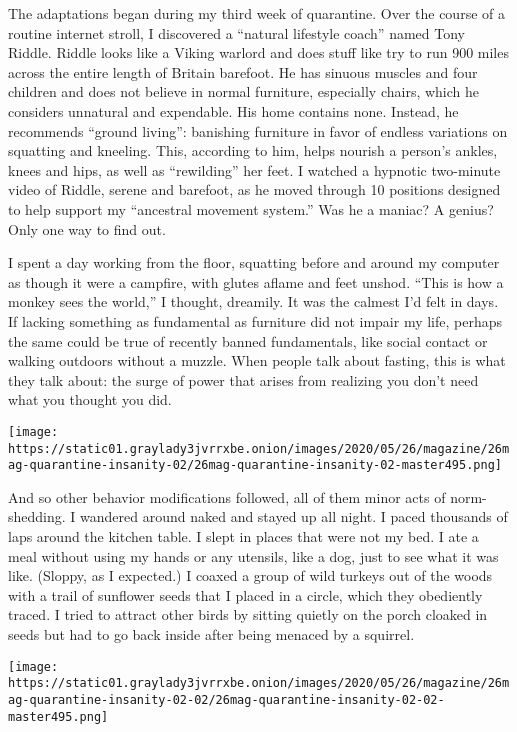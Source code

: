 The adaptations began during my third week of quarantine. Over the
course of a routine internet stroll, I discovered a ``natural lifestyle
coach'' named Tony Riddle. Riddle looks like a Viking warlord and does
stuff like try to run 900 miles across the entire length of Britain
barefoot. He has sinuous muscles and four children and does not believe
in normal furniture, especially chairs, which he considers unnatural and
expendable. His home contains none. Instead, he recommends ``ground
living'': banishing furniture in favor of endless variations on
squatting and kneeling. This, according to him, helps nourish a person's
ankles, knees and hips, as well as ``rewilding'' her feet. I watched a
hypnotic two-minute video of Riddle, serene and barefoot, as he moved
through 10 positions designed to help support my ``ancestral movement
system.'' Was he a maniac? A genius? Only one way to find out.

I spent a day working from the floor, squatting before and around my
computer as though it were a campfire, with glutes aflame and feet
unshod. ``This is how a monkey sees the world,'' I thought, dreamily. It
was the calmest I'd felt in days. If lacking something as fundamental as
furniture did not impair my life, perhaps the same could be true of
recently banned fundamentals, like social contact or walking outdoors
without a muzzle. When people talk about fasting, this is what they talk
about: the surge of power that arises from realizing you don't need what
you thought you did.

\texttt{[image: https://static01.graylady3jvrrxbe.onion/images/2020/05/26/magazine/26mag-quarantine-insanity-02/26mag-quarantine-insanity-02-master495.png]}

And so other behavior modifications followed, all of them minor acts of
norm-shedding. I wandered around naked and stayed up all night. I paced
thousands of laps around the kitchen table. I slept in places that were
not my bed. I ate a meal without using my hands or any utensils, like a
dog, just to see what it was like. (Sloppy, as I expected.) I coaxed a
group of wild turkeys out of the woods with a trail of sunflower seeds
that I placed in a circle, which they obediently traced. I tried to
attract other birds by sitting quietly on the porch cloaked in seeds but
had to go back inside after being menaced by a squirrel.

\texttt{[image: https://static01.graylady3jvrrxbe.onion/images/2020/05/26/magazine/26mag-quarantine-insanity-02-02/26mag-quarantine-insanity-02-02-master495.png]}

